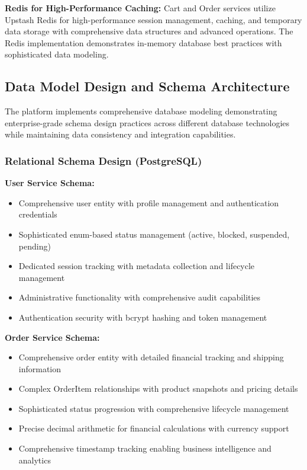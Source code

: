\textbf{Redis for High-Performance Caching:}
Cart and Order services utilize Upstash Redis for high-performance session management, caching, and temporary data storage with comprehensive data structures and advanced operations. The Redis implementation demonstrates in-memory database best practices with sophisticated data modeling.

\subsection{Data Model Design and Schema Architecture}

The platform implements comprehensive database modeling demonstrating enterprise-grade schema design practices across different database technologies while maintaining data consistency and integration capabilities.

\subsubsection{Relational Schema Design (PostgreSQL)}

\textbf{User Service Schema:}
\begin{itemize}
\item Comprehensive user entity with profile management and authentication credentials
\item Sophisticated enum-based status management (active, blocked, suspended, pending)
\item Dedicated session tracking with metadata collection and lifecycle management
\item Administrative functionality with comprehensive audit capabilities
\item Authentication security with bcrypt hashing and token management
\end{itemize}

\textbf{Order Service Schema:}
\begin{itemize}
\item Comprehensive order entity with detailed financial tracking and shipping information
\item Complex OrderItem relationships with product snapshots and pricing details
\item Sophisticated status progression with comprehensive lifecycle management
\item Precise decimal arithmetic for financial calculations with currency support
\item Comprehensive timestamp tracking enabling business intelligence and analytics
\end{itemize}

